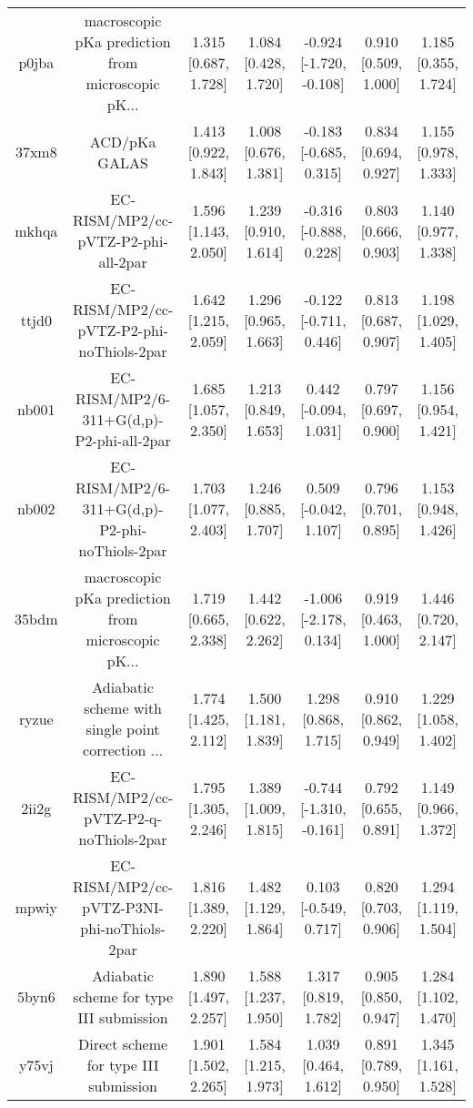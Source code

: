 \documentclass{article}
\begin{document}
\begin{center}
\begin{longtable}{|ccccccc|}
 p0jba &  macroscopic pKa prediction from microscopic pK... &  1.315 [0.687, 1.728] &  1.084 [0.428, 1.720] &  -0.924 [-1.720, -0.108] &  0.910 [0.509, 1.000] &   1.185 [0.355, 1.724] \\
 37xm8 &                                      ACD/pKa GALAS &  1.413 [0.922, 1.843] &  1.008 [0.676, 1.381] &   -0.183 [-0.685, 0.315] &  0.834 [0.694, 0.927] &   1.155 [0.978, 1.333] \\
 mkhqa &                EC-RISM/MP2/cc-pVTZ-P2-phi-all-2par &  1.596 [1.143, 2.050] &  1.239 [0.910, 1.614] &   -0.316 [-0.888, 0.228] &  0.803 [0.666, 0.903] &   1.140 [0.977, 1.338] \\
 ttjd0 &           EC-RISM/MP2/cc-pVTZ-P2-phi-noThiols-2par &  1.642 [1.215, 2.059] &  1.296 [0.965, 1.663] &   -0.122 [-0.711, 0.446] &  0.813 [0.687, 0.907] &   1.198 [1.029, 1.405] \\
 nb001 &           EC-RISM/MP2/6-311+G(d,p)-P2-phi-all-2par &  1.685 [1.057, 2.350] &  1.213 [0.849, 1.653] &    0.442 [-0.094, 1.031] &  0.797 [0.697, 0.900] &   1.156 [0.954, 1.421] \\
 nb002 &      EC-RISM/MP2/6-311+G(d,p)-P2-phi-noThiols-2par &  1.703 [1.077, 2.403] &  1.246 [0.885, 1.707] &    0.509 [-0.042, 1.107] &  0.796 [0.701, 0.895] &   1.153 [0.948, 1.426] \\
 35bdm &  macroscopic pKa prediction from microscopic pK... &  1.719 [0.665, 2.338] &  1.442 [0.622, 2.262] &   -1.006 [-2.178, 0.134] &  0.919 [0.463, 1.000] &   1.446 [0.720, 2.147] \\
 ryzue &  Adiabatic scheme with single point correction ... &  1.774 [1.425, 2.112] &  1.500 [1.181, 1.839] &     1.298 [0.868, 1.715] &  0.910 [0.862, 0.949] &   1.229 [1.058, 1.402] \\
 2ii2g &             EC-RISM/MP2/cc-pVTZ-P2-q-noThiols-2par &  1.795 [1.305, 2.246] &  1.389 [1.009, 1.815] &  -0.744 [-1.310, -0.161] &  0.792 [0.655, 0.891] &   1.149 [0.966, 1.372] \\
 mpwiy &         EC-RISM/MP2/cc-pVTZ-P3NI-phi-noThiols-2par &  1.816 [1.389, 2.220] &  1.482 [1.129, 1.864] &    0.103 [-0.549, 0.717] &  0.820 [0.703, 0.906] &   1.294 [1.119, 1.504] \\
 5byn6 &           Adiabatic scheme for type III submission &  1.890 [1.497, 2.257] &  1.588 [1.237, 1.950] &     1.317 [0.819, 1.782] &  0.905 [0.850, 0.947] &   1.284 [1.102, 1.470] \\
 y75vj &              Direct scheme for type III submission &  1.901 [1.502, 2.265] &  1.584 [1.215, 1.973] &     1.039 [0.464, 1.612] &  0.891 [0.789, 0.950] &   1.345 [1.161, 1.528] \\

\end{longtable}
\end{center}
\end{document}
